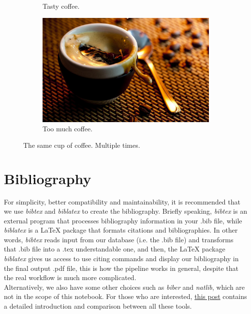 \documentclass[11pt]{article}  %
\begin{document}
\begin{figure}[h!]
\begin{subfigure}[h]{0.2\linewidth}
          \caption{Tasty coffee.}
        \end{subfigure}
        \begin{subfigure}[h]{0.5\linewidth}  %
          \includegraphics[width=\linewidth]{support/coffee.jpg}
          \caption{Too much coffee.}
        \end{subfigure}
        \caption{The same cup of coffee. Multiple times.}
        \label{f3}
      \end{figure}


  \section{Bibliography}
    For simplicity, better compatibility and maintainability, it is recommended that we use \textit{bibtex} and \textit{biblatex} to create the bibliography. Briefly speaking, \textit{bibtex} is an external program that processes bibliography information in your .bib file, while \textit{biblatex} is a LaTeX package that formats citations and bibliographies. In other words, \textit{bibtex} reads input from our database (i.e. the .bib file) and transforms that .bib file into a .tex understandable one, and then, the LaTeX package \textit{biblatex} gives us access to use citing commands and display our bibliography in the final output .pdf file, this is how the pipeline works in general, despite that the real workflow is much more complicated.\\

    Alternatively, we also have some other choices such as \textit{biber} and \textit{natlib}, which are not in the scope of this notebook. For those who are interested, \href{https://tex.stackexchange.com/questions/25701/bibtex-vs-biber-and-biblatex-vs-natbib}{this post} contains a detailed introduction and comparison between all these tools.
\end{document}
